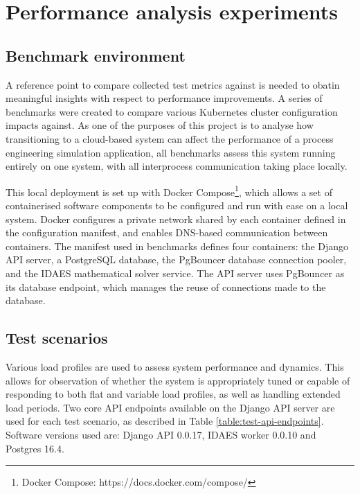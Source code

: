 \section{Performance analysis experiments}
\subsection{Benchmark environment}

A reference point to compare collected test metrics against is needed to obatin meaningful insights with respect to performance improvements. A series of benchmarks were created to compare various Kubernetes cluster configuration impacts against. As one of the purposes of this project is to analyse how transitioning to a cloud-based system can affect the performance of a process engineering simulation application, all benchmarks assess this system running entirely on one system, with all interprocess communication taking place locally.

This local deployment is set up with Docker Compose\footnote{Docker Compose: https://docs.docker.com/compose/}, which allows a set of containerised software components to be configured and run with ease on a local system. Docker configures a private network shared by each container defined in the configuration manifest, and enables DNS-based communication between containers. The manifest used in benchmarks defines four containers: the Django API server, a PostgreSQL database, the PgBouncer database connection pooler, and the IDAES mathematical solver service. The API server uses PgBouncer as its database endpoint, which manages the reuse of connections made to the database. 

\subsection{Test scenarios}

Various load profiles are used to assess system performance and dynamics. This allows for observation of whether the system is appropriately tuned or capable of responding to both flat and variable load profiles, as well as handling extended load periods. Two core API endpoints available on the Django API server are used for each test scenario, as described in Table \ref{table:test-api-endpoints}. Software versions used are: Django API 0.0.17, IDAES worker 0.0.10 and Postgres 16.4.

